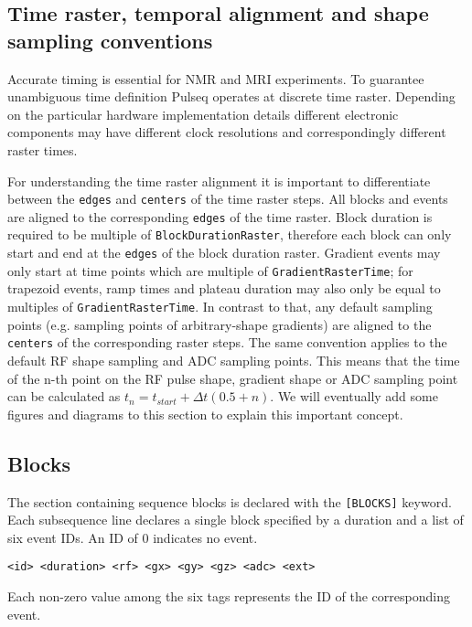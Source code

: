 \documentclass{article}
\begin{document}
\subsection{Time raster, temporal alignment and shape sampling conventions}

Accurate timing is essential for NMR and MRI experiments. To guarantee 	
unambiguous time definition Pulseq operates at discrete time raster. Depending on the particular hardware implementation details different electronic components may have different clock resolutions and correspondingly different raster times. 

For understanding the time raster alignment it is important to differentiate between the \verb.edges. and \verb.centers. of the time raster steps. All blocks and events are aligned to the corresponding \verb.edges. of the time raster. Block duration is required to be multiple of \verb.BlockDurationRaster., therefore each block can only start and end at the \verb.edges. of the block duration raster. Gradient events may only start at time points which are multiple of \verb.GradientRasterTime.; for trapezoid events, ramp times and plateau duration may also only be equal to multiples of \verb.GradientRasterTime.. In contrast to that, any default sampling points (e.g. sampling points of arbitrary-shape gradients) are aligned to the \verb.centers. of the corresponding raster steps. The same convention applies to the default RF shape sampling and ADC sampling points. This means that the time of the n-th point on the RF pulse shape, gradient shape or ADC sampling point can be calculated as $t_n=t_{start} + \Delta t(0.5+n)$. We will eventually add some figures and diagrams to this section to explain this important concept.


\subsection{Blocks}

The section containing sequence blocks is declared with the \verb.[BLOCKS]. keyword. Each subsequence line declares a single block specified by a duration and a list of six event IDs. An ID of 0 indicates no event.
\begin{lstlisting}
<id> <duration> <rf> <gx> <gy> <gz> <adc> <ext>
\end{lstlisting}

Each non-zero value among the six tags represents the ID of the corresponding event.
\end{document}
